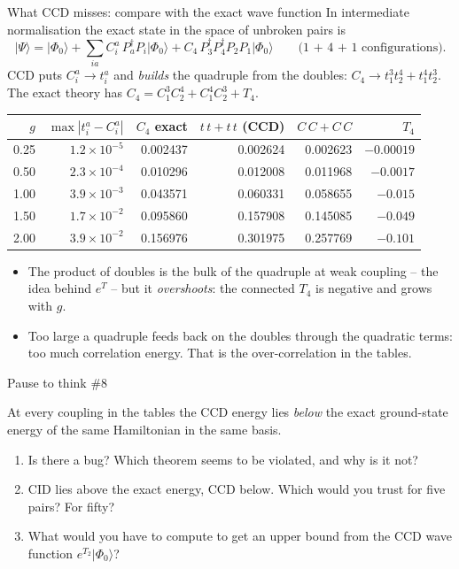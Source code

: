 \documentclass[aspectratio=169,10pt]{beamer}
\newcounter{thinkctr}
\newcommand{\thinkq}[2]{%
  \stepcounter{thinkctr}%
  \vfill
  \begin{tcolorbox}[enhanced,colback=palewarm,colframe=warm,boxrule=1.2pt,arc=4pt,
    grow to left by=6mm,grow to right by=6mm,
    left=16pt,right=16pt,top=16pt,bottom=18pt,
    fonttitle=\bfseries\Large,fontupper=\Large,
    title={Pause to think \#\thethinkctr\hfill\mdseries\normalsize(about #1 min -- discuss with your neighbour)}]
  #2
  \end{tcolorbox}
  \vfill}
\newcommand{\ket}[1]{\vert #1\rangle}
\newcommand{\ph}{\Phi_0}
\begin{document}
\begin{frame}[shrink=13]{What CCD misses: compare with the exact wave function}
\small
In intermediate normalisation the exact state in the space of unbroken pairs is
\[
 \ket{\Psi}=\ket{\ph}+\sum_{ia}C_i^a\,P_a^\dagger P_i\ket{\ph}+C_4\,P_3^\dagger P_4^\dagger P_2P_1\ket{\ph}
 \qquad\text{(1 + 4 + 1 configurations).}
\]
CCD puts $C_i^a\to t_i^a$ and \emph{builds} the quadruple from the doubles: $C_4\to t_1^3t_2^4+t_1^4t_2^3$. The exact theory has $C_4=C_1^3C_2^4+C_1^4C_2^3+T_4$.
\begin{center}
\renewcommand{\arraystretch}{1.2}
\begin{tabular}{rrrrrr}
\toprule
$g$ & $\max|t_i^a-C_i^a|$ & $C_4$ exact & $t\,t+t\,t$ (CCD) & $C\,C+C\,C$ & $T_4$\\
\midrule
0.25 & $1.2\times10^{-5}$ & 0.002437 & 0.002624 & 0.002623 & $-0.00019$\\
0.50 & $2.3\times10^{-4}$ & 0.010296 & 0.012008 & 0.011968 & $-0.0017$\\
1.00 & $3.9\times10^{-3}$ & 0.043571 & 0.060331 & 0.058655 & $-0.015$\\
1.50 & $1.7\times10^{-2}$ & 0.095860 & 0.157908 & 0.145085 & $-0.049$\\
2.00 & $3.9\times10^{-2}$ & 0.156976 & 0.301975 & 0.257769 & $-0.101$\\
\bottomrule
\end{tabular}
\end{center}
\begin{itemize}
\item The product of doubles is the bulk of the quadruple at weak coupling -- the idea behind $e^{T}$ -- but it \emph{overshoots}: the connected $T_4$ is negative and grows with $g$.
\item Too large a quadruple feeds back on the doubles through the quadratic terms: too much correlation energy. That is the over-correlation in the tables.
\end{itemize}
\end{frame}

\begin{frame}{Pause to think \#8}
\thinkq{3}{At every coupling in the tables the CCD energy lies \emph{below} the exact ground-state energy of the same Hamiltonian in the same basis.
\begin{enumerate}
\item Is there a bug? Which theorem seems to be violated, and why is it not?
\item CID lies above the exact energy, CCD below. Which would you trust for five pairs? For fifty?
\item What would you have to compute to get an upper bound from the CCD wave function $e^{T_2}\ket{\ph}$?
\end{enumerate}}
\end{frame}
\end{document}
